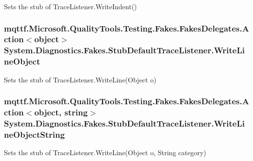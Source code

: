 Sets the stub of Trace\-Listener.\-Write\-Indent()

\hypertarget{class_system_1_1_diagnostics_1_1_fakes_1_1_stub_default_trace_listener_a3d438e472a7ed9f58d67f8b5cccc609e}{
\subsubsection[{Write\-Line\-Object}]{\setlength{\rightskip}{0pt plus 5cm}mqttf.\-Microsoft.\-Quality\-Tools.\-Testing.\-Fakes.\-Fakes\-Delegates.\-Action$<$object$>$ System.\-Diagnostics.\-Fakes.\-Stub\-Default\-Trace\-Listener.\-Write\-Line\-Object}}\label{class_system_1_1_diagnostics_1_1_fakes_1_1_stub_default_trace_listener_a3d438e472a7ed9f58d67f8b5cccc609e}


Sets the stub of Trace\-Listener.\-Write\-Line(\-Object o)

\hypertarget{class_system_1_1_diagnostics_1_1_fakes_1_1_stub_default_trace_listener_ac0df66003484e60dc82b01790d184bb7}{
\subsubsection[{Write\-Line\-Object\-String}]{\setlength{\rightskip}{0pt plus 5cm}mqttf.\-Microsoft.\-Quality\-Tools.\-Testing.\-Fakes.\-Fakes\-Delegates.\-Action$<$object, string$>$ System.\-Diagnostics.\-Fakes.\-Stub\-Default\-Trace\-Listener.\-Write\-Line\-Object\-String}}\label{class_system_1_1_diagnostics_1_1_fakes_1_1_stub_default_trace_listener_ac0df66003484e60dc82b01790d184bb7}


Sets the stub of Trace\-Listener.\-Write\-Line(\-Object o, String category)

